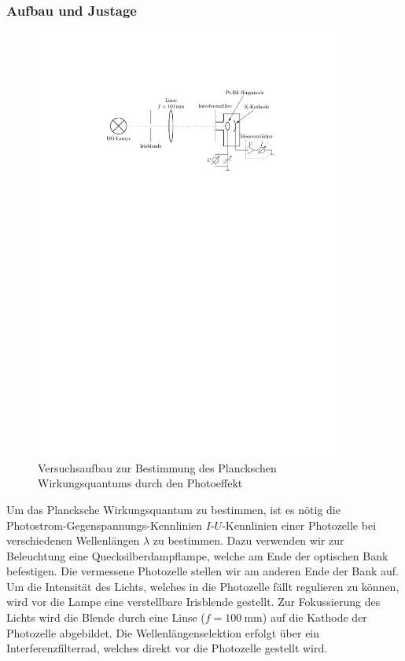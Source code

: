\documentclass[11pt, a4paper]{article}
\numberwithin{equation}{section}
\begin{document}
\subsubsection{Aufbau und Justage}
\begin{figure}[h]
	\centering
	\includegraphics[width=0.9\textwidth]{./figures/versuchsaufbau_photoeffekt.pdf}
	\caption{Versuchsaufbau zur Bestimmung des Planckschen Wirkungsquantums durch den Photoeffekt}
	\label{fig:aufbau_photoeffekt}
\end{figure}
Um das Plancksche Wirkungsquantum zu bestimmen, ist es nötig die Photostrom-Gegenspannungs-Kennlinien $I$-$U$-Kennlinien einer Photozelle bei verschiedenen Wellenlängen $\lambda$ zu bestimmen.
Dazu verwenden wir zur Beleuchtung eine Quecksilberdampflampe, welche am Ende der optischen Bank befestigen.
Die vermessene Photozelle stellen wir am anderen Ende der Bank auf.
Um die Intensität des Lichts, welches in die Photozelle fällt regulieren zu können, wird vor die Lampe eine verstellbare Irisblende gestellt.
Zur Fokussierung des Lichts wird die Blende durch eine Linse ($f=\SI{100}{\milli\metre}$) auf die Kathode der Photozelle abgebildet.
Die Wellenlängenselektion erfolgt über ein Interferenzfilterrad, welches direkt vor die Photozelle gestellt wird.
\end{document}
